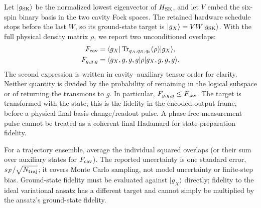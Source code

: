 \documentclass[aps,prb,reprint,amsmath,amssymb,nofootinbib]{revtex4-2}
\newcommand{\ket}[1]{\lvert#1\rangle}
\newcommand{\bra}[1]{\langle#1\rvert}
\newcommand{\tr}{\operatorname{Tr}}
\begin{document}
Let $\ket{g_{\rm SK}}$ be the normalized lowest eigenvector of
$H_{\rm SK}$, and let $V$ embed the six-spin binary basis in the two
cavity Fock spaces. The retained hardware schedule stops before the
last $W$, so its ground-state target is
$\ket{g_X}=VW\ket{g_{\rm SK}}$. With the full physical density matrix
$\rho$, we report two unconditioned overlaps:
\begin{align}
 F_{\rm cav}&=\bra{g_X}\tr_{q_A,q_B,q_b}(\rho)\ket{g_X},\\
 F_{g,g,g}&=\bra{g_X,g,g,g}\rho\ket{g_X,g,g,g}.
\end{align}
The second expression is written in cavity--auxiliary tensor order for
clarity. Neither quantity is divided by the probability of remaining in
the logical subspace or of returning the transmons to $g$. In particular,
$F_{g,g,g}\leq F_{\rm cav}$. The target is transformed with the state;
this is the fidelity in the encoded output frame, before a physical
final basis-change/readout pulse. A phase-free measurement pulse cannot
be treated as a coherent final Hadamard for state-preparation fidelity.

For a trajectory ensemble, average the individual squared overlaps
(or their sum over auxiliary states for $F_{\rm cav}$). The reported
uncertainty is one standard error, $s_F/\sqrt{N_{\rm traj}}$; it covers
Monte Carlo sampling, not model uncertainty or finite-step bias.
Ground-state fidelity must be evaluated against $\ket{g_X}$ directly;
fidelity to the ideal variational ansatz has a different target and
cannot simply be multiplied by the ansatz's ground-state fidelity.



\end{document}
